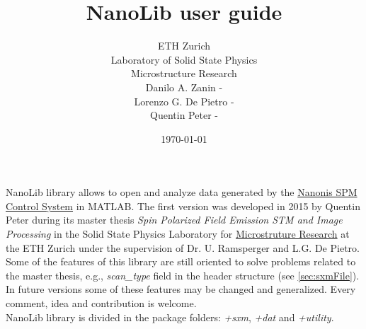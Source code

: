 


\newcommand{\mcode}[1]{\texttt{>\.> #1}}

\renewcommand{\familydefault}{\sfdefault}
\setlength\parindent{0pt}

\newcommand{\+}[1]{\item \textbf{#1}}

\newcommand{\nanonis}{\href{http://www.specs-zurich.com/en/home.html;jsessionid=FCD8A587EE447665C3F4A8CC374671EE}{Nanonis SPM Control System\texttrademark}}
\newcommand{\matlab}{MATLAB\texttrademark}


\title{NanoLib user guide}
\author{
ETH Zurich\\
Laboratory of Solid State Physics\\\vspace{.5em}
Microstructure Research\\ 
{\small Danilo A. Zanin - }\\
{\small Lorenzo G. De Pietro - }\\
{\small Quentin Peter - }
}

\date{\today}


\maketitle
NanoLib library allows to open and analyze data generated by the \nanonis{} in \matlab.
The first version was developed in 2015 by Quentin Peter during its master thesis \emph{Spin Polarized Field Emission STM and Image Processing} in the Solid State Physics Laboratory for \href{http://www.microstructure.ethz.ch}{Microstruture Research} at the ETH Zurich under the supervision of Dr. U. Ramsperger and L.G. De Pietro.
Some of the features of this library are still oriented to solve problems related to the master  thesis, e.g., \emph{scan\_type} field in the header structure (see \ref{sec:sxmFile}). 
In future versions some of these features may be changed and generalized. Every comment, idea and contribution is welcome.\\

NanoLib library is divided in the package folders: \emph{+sxm}, \emph{+dat} and \emph{+utility}.


